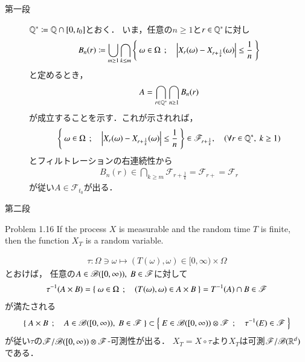 \begin{prf}\mbox{}
	\begin{description}
		\item[第一段]
			$\mathbb{Q}^* \coloneqq \mathbb{Q} \cap [0,t_0]$とおく．
			いま，任意の$n \geq 1$と$r \in \mathbb{Q}^*$に対し
			\begin{align}
				B_n (r) \coloneqq
				\bigcup_{m \geq 1} \bigcap_{k \leq m} 
				\left\{\ \omega \in \Omega\ \, ; \quad \left| X_r(\omega)-X_{r+\frac{1}{k}}(\omega) \right| \leq \frac{1}{n}\ \right\}
			\end{align}
			と定めるとき，
			\begin{align}
				A = \bigcap_{r \in \mathbb{Q}^*} \bigcap_{n \geq 1} B_n(r)
			\end{align}
			が成立することを示す．これが示されれば，
			\begin{align}
				\left\{\ \omega \in \Omega\ \, ; \quad \left| X_r(\omega)-X_{r+\frac{1}{k}}(\omega) \right| \leq \frac{1}{n}\ \right\}
				\in \mathscr{F}_{r+\frac{1}{k}},
				\quad (\forall r \in \mathbb{Q}^*,\ k \geq 1)
			\end{align}
			とフィルトレーションの右連続性から
			\begin{align}
				B_n (r) \in \bigcap_{k \geq m} \mathscr{F}_{r+\frac{1}{k}} = \mathscr{F}_{r+} = \mathscr{F}_{r}
			\end{align}
			が従い$A \in \mathscr{F}_{t_0}$が出る．
		
		\item[第二段]
			
	\end{description}
\end{prf}

\begin{itembox}[l]{Problem 1.16}
	If the process $X$ is measurable and the random time $T$ is finite, 
	then the function $X_T$ is a random variable.
\end{itembox}

\begin{prf}
	\begin{align}
		\tau:\Omega \ni \omega \longmapsto (T(\omega),\omega) \in [0,\infty) \times \Omega
	\end{align}
	とおけば，
	任意の$A \in \mathscr{B}([0,\infty)),\ B \in \mathscr{F}$に対して
	\begin{align}
		\tau^{-1}(A \times B) = \left\{\ \omega \in \Omega\ \, ; \quad (T(\omega),\omega) \in A \times B\ \right\}
		= T^{-1}(A) \cap B \in \mathscr{F}
	\end{align}
	が満たされる
	\begin{align}
		\left\{\ A \times B\ \, ; \quad A \in \mathscr{B}([0,\infty)),\ B \in \mathscr{F}\ \right\}
		\subset \left\{\ E \in \mathscr{B}([0,\infty)) \otimes \mathscr{F}\ \, ; \quad \tau^{-1}(E) \in \mathscr{F}\ \right\}
	\end{align}
	が従い$\tau$の$\mathscr{F}/\mathscr{B}([0,\infty)) \otimes \mathscr{F}$-可測性が出る．
	$X_T = X \circ \tau$より$X_T$は可測$\mathscr{F}/\mathscr{B}(\mathbb{R}^d)$である．
	\QED
\end{prf}

